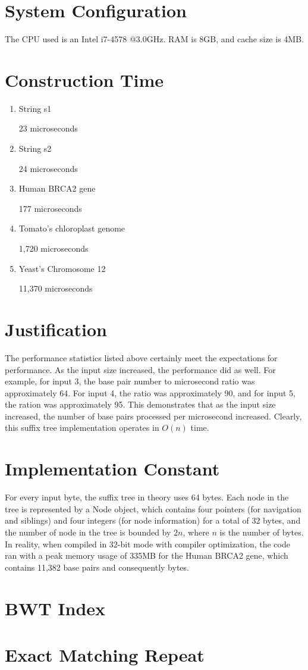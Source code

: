 \documentclass[12pt,a4paper]{article}
\author{Raeanne Marks}
\begin{document}
\section{System Configuration}
The CPU used is an Intel i7-4578 @3.0GHz. RAM is 8GB, and cache size is 4MB.
\section{Construction Time}
\begin{enumerate}
\item String s1

 23 microseconds
 
\item String s2

 24 microseconds
 
\item Human BRCA2 gene

 177 microseconds
 
\item Tomato's chloroplast genome

 1,720 microseconds
 
\item Yeast's Chromosome 12

11,370 microseconds
\end{enumerate}
\section{Justification}
The performance statistics listed above certainly meet the expectations for performance. As the input size increased, the performance did as well. For example, for input 3, the base pair number to microsecond ratio was approximately 64. For input 4, the ratio was approximately 90, and for input 5, the ration was approximately 95. This demonstrates that as the input size increased, the number of base pairs processed per microsecond increased. Clearly, this suffix tree implementation operates in $O(n)$ time.
\section{Implementation Constant}
For every input byte, the suffix tree in theory uses 64 bytes. Each node in the tree is represented by a Node object, which contains four pointers (for navigation and siblings) and four integers (for node information) for a total of 32 bytes, and the number of node in the tree is bounded by $2n$, where $n$ is the number of bytes. In reality, when compiled in 32-bit mode with compiler optimization, the code ran with a peak memory usage of 335MB for the Human BRCA2 gene, which contains 11,382 base pairs and consequently bytes.
\section{BWT Index}
\section{Exact Matching Repeat}
\end{document}
